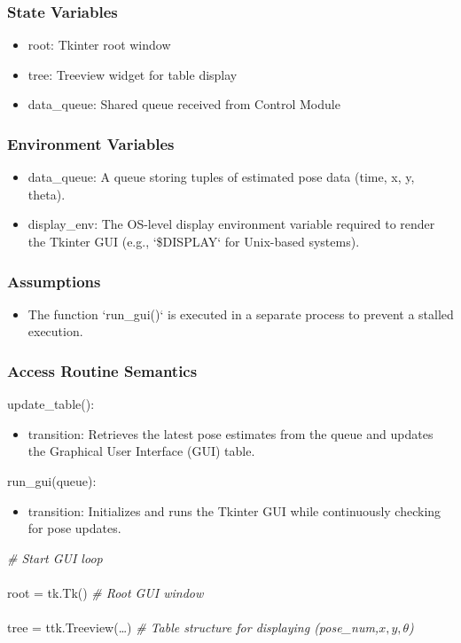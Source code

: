 \documentclass[12pt, titlepage]{article}
\begin{document}
\subsubsection{State Variables}
\begin{itemize}
  \item root: Tkinter root window
  \item tree: Treeview widget for table display
  \item data\_queue: Shared queue received from Control Module
\end{itemize}
\subsubsection{Environment Variables}
\begin{itemize}
  \item data\_queue: A queue storing tuples of estimated pose data (time, x, y, theta).
  \item display\_env: The OS-level display environment variable required to render the Tkinter GUI (e.g., `\$DISPLAY` for Unix-based systems).
\end{itemize}

\subsubsection{Assumptions}
\begin{itemize}
  \item The function `run\_gui()` is executed in a separate process to prevent a stalled execution.
\end{itemize}
\subsubsection{Access Routine Semantics}

\noindent update\_table():
\begin{itemize}
    \item transition: Retrieves the latest pose estimates from the queue and updates the Graphical User Interface (GUI) table.
\end{itemize}

\noindent run\_gui(queue):
\begin{itemize}
    \item transition: Initializes and runs the Tkinter GUI while continuously checking for pose updates.
\end{itemize}

\noindent \textit{\# Start GUI loop}\\\\
root = tk.Tk()  \textit{\# Root GUI window}\\\\
tree = ttk.Treeview(\dots)  \textit{\# Table structure for displaying (pose\_num,$ x, y, \theta$)}\\\\
\end{document}
